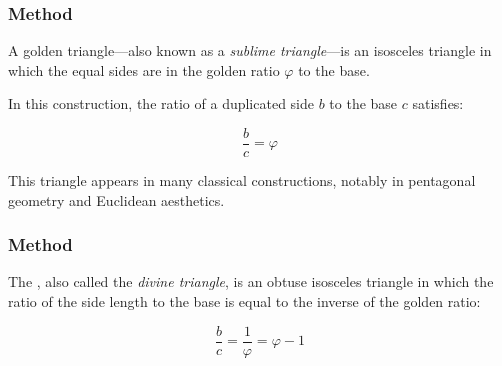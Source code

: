 \subsubsection{Method }
\label{ssub:method_line_golden}

A golden triangle—also known as a \emph{sublime triangle}—is an isosceles triangle in which the equal sides are in the golden ratio $\varphi$ to the base.

\medskip
\noindent
In this construction, the ratio of a duplicated side $b$ to the base $c$ satisfies:

\[
\dfrac{b}{c} = \varphi
\]

\noindent
This triangle appears in many classical constructions, notably in pentagonal geometry and Euclidean aesthetics.

\vspace{1em}
\begin{minipage}{.5\textwidth}
\begin{center}
\end{center}
\end{minipage}
\begin{minipage}{.5\textwidth}
\begin{tkzexample}
\end{tkzexample}
\end{minipage}

\subsubsection{Method }
\label{ssub:method_line_golden__gnomon}

The , also called the \emph{divine triangle}, is an obtuse isosceles triangle in which the ratio of the side length to the base is equal to the inverse of the golden ratio:

\[
\dfrac{b}{c} = \frac{1}{\varphi} = \varphi - 1
\]

